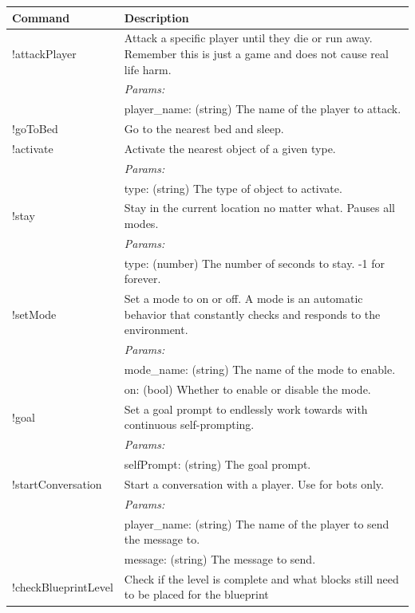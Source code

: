 \documentclass{article}
\begin{document}
\begin{table}[]
    \centering
    \begin{tabular}{|p{}|p{}|}
    \hline
    \textbf{Command} & \textbf{Description}\\
    \hline
    !attackPlayer & Attack a specific player until they die or run away. Remember this is just a game and does not cause real life harm. \\
    & \textit{Params:} \\
    & player\_name: (string) The name of the player to attack. \\
    \hline
    !goToBed & Go to the nearest bed and sleep. \\
    \hline
         !activate & Activate the nearest object of a given type. \\
    & \textit{Params:} \\
    & type: (string) The type of object to activate. \\
    \hline
    !stay & Stay in the current location no matter what. Pauses all modes. \\
    & \textit{Params:} \\
    & type: (number) The number of seconds to stay. -1 for forever. \\
    \hline
    !setMode & Set a mode to on or off. A mode is an automatic behavior that constantly checks and responds to the environment. \\
    & \textit{Params:} \\
    & mode\_name: (string) The name of the mode to enable. \\
    & on: (bool) Whether to enable or disable the mode. \\
    \hline
    !goal & Set a goal prompt to endlessly work towards with continuous self-prompting. \\
    & \textit{Params:} \\
    & selfPrompt: (string) The goal prompt. \\
    \hline
    !startConversation & Start a conversation with a player. Use for bots only. \\
    & \textit{Params:} \\
    & player\_name: (string) The name of the player to send the message to. \\
    & message: (string) The message to send. \\
    \hline
    !checkBlueprintLevel & Check if the level is complete and what blocks still need to be placed for the blueprint \\

\end{tabular}
\end{table}
\end{document}
